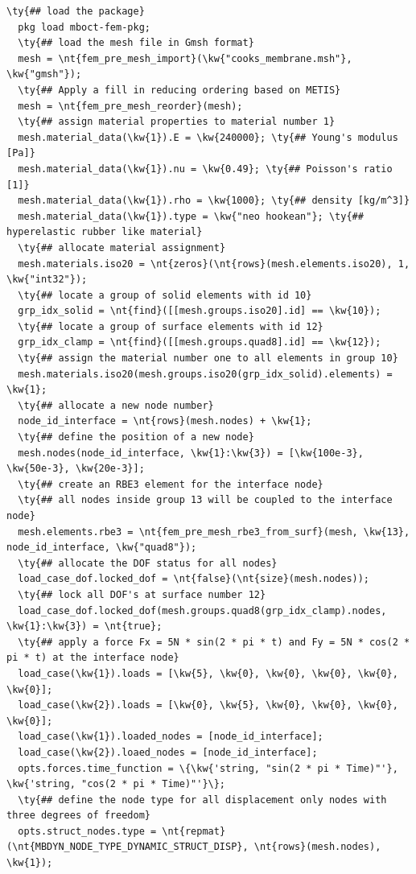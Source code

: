 \begin{Verbatim}[commandchars=\\\{\}]
  \ty{## load the package}
  pkg load mboct-fem-pkg;
  \ty{## load the mesh file in Gmsh format}
  mesh = \nt{fem_pre_mesh_import}(\kw{"cooks_membrane.msh"}, \kw{"gmsh"});
  \ty{## Apply a fill in reducing ordering based on METIS}
  mesh = \nt{fem_pre_mesh_reorder}(mesh);
  \ty{## assign material properties to material number 1}
  mesh.material_data(\kw{1}).E = \kw{240000}; \ty{## Young's modulus [Pa]}
  mesh.material_data(\kw{1}).nu = \kw{0.49}; \ty{## Poisson's ratio [1]}
  mesh.material_data(\kw{1}).rho = \kw{1000}; \ty{## density [kg/m^3]}
  mesh.material_data(\kw{1}).type = \kw{"neo hookean"}; \ty{## hyperelastic rubber like material}
  \ty{## allocate material assignment}
  mesh.materials.iso20 = \nt{zeros}(\nt{rows}(mesh.elements.iso20), 1, \kw{"int32"});
  \ty{## locate a group of solid elements with id 10}
  grp_idx_solid = \nt{find}([[mesh.groups.iso20].id] == \kw{10});
  \ty{## locate a group of surface elements with id 12}
  grp_idx_clamp = \nt{find}([[mesh.groups.quad8].id] == \kw{12});
  \ty{## assign the material number one to all elements in group 10}
  mesh.materials.iso20(mesh.groups.iso20(grp_idx_solid).elements) = \kw{1};
  \ty{## allocate a new node number}
  node_id_interface = \nt{rows}(mesh.nodes) + \kw{1};
  \ty{## define the position of a new node}
  mesh.nodes(node_id_interface, \kw{1}:\kw{3}) = [\kw{100e-3}, \kw{50e-3}, \kw{20e-3}];
  \ty{## create an RBE3 element for the interface node}
  \ty{## all nodes inside group 13 will be coupled to the interface node}
  mesh.elements.rbe3 = \nt{fem_pre_mesh_rbe3_from_surf}(mesh, \kw{13}, node_id_interface, \kw{"quad8"});
  \ty{## allocate the DOF status for all nodes}
  load_case_dof.locked_dof = \nt{false}(\nt{size}(mesh.nodes));
  \ty{## lock all DOF's at surface number 12}
  load_case_dof.locked_dof(mesh.groups.quad8(grp_idx_clamp).nodes, \kw{1}:\kw{3}) = \nt{true};
  \ty{## apply a force Fx = 5N * sin(2 * pi * t) and Fy = 5N * cos(2 * pi * t) at the interface node}
  load_case(\kw{1}).loads = [\kw{5}, \kw{0}, \kw{0}, \kw{0}, \kw{0}, \kw{0}];
  load_case(\kw{2}).loads = [\kw{0}, \kw{5}, \kw{0}, \kw{0}, \kw{0}, \kw{0}];
  load_case(\kw{1}).loaded_nodes = [node_id_interface];
  load_case(\kw{2}).loaed_nodes = [node_id_interface];
  opts.forces.time_function = \{\kw{'string, "sin(2 * pi * Time)"'}, \kw{'string, "cos(2 * pi * Time)"'}\};
  \ty{## define the node type for all displacement only nodes with three degrees of freedom}
  opts.struct_nodes.type = \nt{repmat}(\nt{MBDYN_NODE_TYPE_DYNAMIC_STRUCT_DISP}, \nt{rows}(mesh.nodes), \kw{1});

\end{Verbatim}
